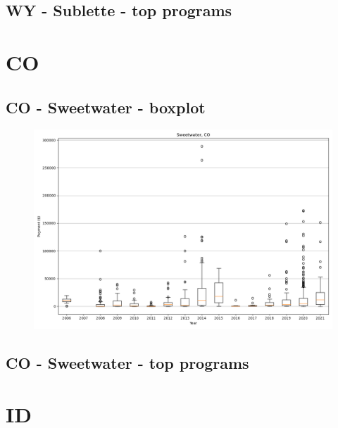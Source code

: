 \subsection*{WY - Sublette - top programs}

\newpage
\section*{CO}
\subsection*{CO - Sweetwater - boxplot}
\begin{figure}[h]
\centering
\includegraphics[width=7in]{../output/boxplots/counties/Sweetwater-CO_boxplot.png}
\end{figure}


\subsection*{CO - Sweetwater - top programs}

\newpage
\section*{ID}
